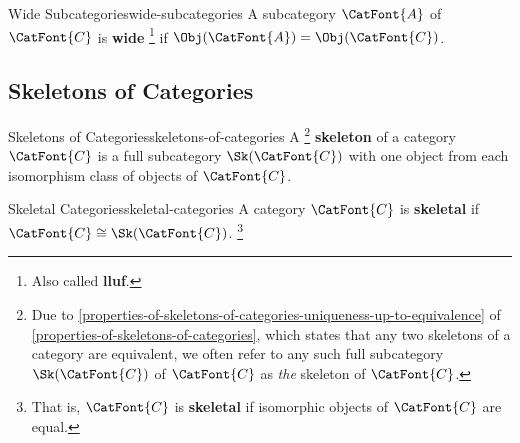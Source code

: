 \begin{definition}{Wide Subcategories}{wide-subcategories}%
    A subcategory $\CatFont{A}$ of $\CatFont{C}$ is \textbf{wide}%
    \footnote{%
        Also called \textbf{lluf}.
        \par\vspace*{\TCBBoxCorrection}
    } %
    if $\Obj(\CatFont{A})=\Obj(\CatFont{C})$.
\end{definition}
\subsection{Skeletons of Categories}\label{subsection-skeletons-of-categories}
\begin{definition}{Skeletons of Categories}{skeletons-of-categories}%
    A%
    \footnote{%
        Due to \cref{properties-of-skeletons-of-categories-uniqueness-up-to-equivalence} of \cref{properties-of-skeletons-of-categories}, which states that any two skeletons of a category are equivalent, we often refer to any such full subcategory $\Sk(\CatFont{C})$ of $\CatFont{C}$ as \emph{the} skeleton of $\CatFont{C}$.
        \par\vspace*{\TCBBoxCorrection}
    } %
    \textbf{skeleton} of a category $\CatFont{C}$ is a full subcategory $\Sk(\CatFont{C})$ with one object from each isomorphism class of objects of $\CatFont{C}$.
\end{definition}
\begin{definition}{Skeletal Categories}{skeletal-categories}%
    A category $\CatFont{C}$ is \textbf{skeletal} if $\CatFont{C}\cong\Sk(\CatFont{C})$.%
    \footnote{%
        That is, $\CatFont{C}$ is \textbf{skeletal} if isomorphic objects of $\CatFont{C}$ are equal.
        \par\vspace*{\TCBBoxCorrection}
    }%
\end{definition}
